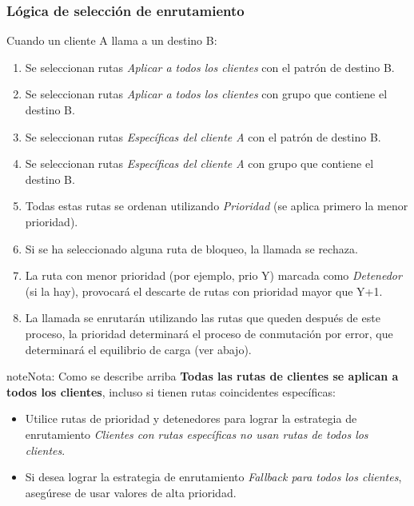 \documentclass[letterpaper,10pt,spanish]{sphinxmanual}
\begin{document}
\subsubsection{Lógica de selección de enrutamiento}
\label{administration_portal/brand/routing/outgoing_routings:routing-selection-logic}
Cuando un cliente A llama a un destino B:
\begin{enumerate}
\item {} 
Se seleccionan rutas \emph{Aplicar a todos los clientes} con el patrón de destino B.

\item {} 
Se seleccionan rutas \emph{Aplicar a todos los clientes} con grupo que contiene el destino B.

\item {} 
Se seleccionan rutas \emph{Específicas del cliente A} con el patrón de destino B.

\item {} 
Se seleccionan rutas \emph{Específicas del cliente A} con grupo que contiene el destino B.

\item {} 
Todas estas rutas se ordenan utilizando \emph{Prioridad} (se aplica primero la menor prioridad).

\item {} 
Si se ha seleccionado alguna ruta de bloqueo, la llamada se rechaza.

\item {} 
La ruta con menor prioridad (por ejemplo, prio Y) marcada como \emph{Detenedor} (si la hay), provocará el descarte de rutas con prioridad mayor que Y+1.

\item {} 
La llamada se enrutarán utilizando las rutas que queden después de este proceso, la prioridad determinará el proceso de conmutación por error, que determinará el equilibrio de carga (ver abajo).

\end{enumerate}

\begin{notice}{note}{Nota:}
Como se describe arriba \textbf{Todas las rutas de clientes se aplican a todos los clientes}, incluso si tienen rutas coincidentes específicas:
\begin{itemize}
\item {} 
Utilice rutas de prioridad y detenedores para lograr la estrategia de enrutamiento \emph{Clientes con rutas específicas no usan rutas de todos los clientes}.

\item {} 
Si desea lograr la estrategia de enrutamiento \emph{Fallback para todos los clientes}, asegúrese de usar valores de alta prioridad.

\end{itemize}
\end{notice}
\end{document}

